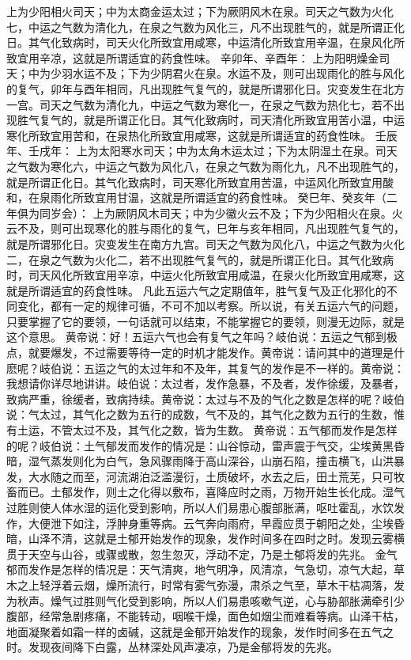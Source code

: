 \documentclass[12pt,UTF8]{ctexbook}
\begin{document}
上为少阳相火司天；中为太商金运太过；下为厥阴风木在泉。司天之气数为火化七，中运之气数为清化九，在泉之气数为风化三，凡不出现胜气的，就是所谓正化日。其气化致病时，司天火化所致宜用咸寒，中运清化所致宜用辛温，在泉风化所致宜用辛凉，这就是所谓适宜的药食性味。
辛卯年、辛酉年：
上为阳明燥金司天；中为少羽水运不及；下为少阴君火在泉。水运不及，则可出现雨化的胜与风化的复气，卯年与酉年相同，凡出现胜气复气的，就是所谓邪化日。灾变发生在北方一宫。司天之气数为清化九，中运之气数为寒化一，在泉之气数为热化七，若不出现胜气复气的，就是所谓正化日。其气化致病时，司天清化所致宜用苦小温，中运寒化所致宜用苦和，在泉热化所致宜用咸寒，这就是所谓适宜的药食性味。
壬辰年、壬戌年：
上为太阳寒水司天；中为太角木运太过；下为太阴湿土在泉。司天之气数为寒化六，中运之气数为风化八，在泉之气数为雨化九，凡不出现胜气的，就是所谓正化日。其气化致病时，司天寒化所致宜用苦温，中运风化所致宜用酸和，在泉雨化所致宜用甘温，这就是所谓适宜的药食性味。
癸巳年、癸亥年（二年俱为同岁会）：
上为厥阴风木司天；中为少徽火云不及；下为少阳相火在泉。火云不及，则可出现寒化的胜与雨化的复气，巳年与亥年相同，凡出现胜气复气的，就是所谓邪化日。灾变发生在南方九宫。司天之气数为风化八，中运之气数为火化二，在泉之气数为火化二，若不出现胜气复气的，就是所谓正化日。其气化致病时，司天风化所致宜用辛凉，中运火化所致宜用咸温，在泉火化所致宜用咸寒，这就是所谓适宜的药食性味。
凡此五运六气之定期值年，胜气复气及正化邪化的不同变化，都有一定的规律可循，不可不加以考察。所以说，有关五运六气的问题，只要掌握了它的要领，一句话就可以结束，不能掌握它的要领，则漫无边际，就是这个意思。
黄帝说：好！五运六气也会有复气之年吗？岐伯说：五运之气郁到极点，就要爆发，不过需要等待一定的时机才能发作。黄帝说：请问其中的道理是什麽呢？岐伯说：五运之气的太过年和不及年，其复气的发作是不一样的。黄帝说：我想请你详尽地讲讲。岐伯说：太过者，发作急暴，不及者，发作徐缓，及暴者，致病严重，徐缓者，致病持续。黄帝说：太过与不及的气化之数是怎样的呢？岐伯说：气太过，其气化之数为五行的成数，气不及的，其气化之数为五行的生数，惟有土运，不管太过不及，其气化之数，皆为生数。
黄帝说：五气郁而发作是怎样的呢？岐伯说：土气郁发而发作的情况是：山谷惊动，雷声震于气交，尘埃黄黑昏暗，湿气蒸发则化为白气，急风骤雨降于高山深谷，山崩石陷，撞击横飞，山洪暴发，大水随之而至，河流湖泊泛滥漫衍，土质破坏，水去之后，田土荒芜，只可牧畜而已。土郁发作，则土之化得以敷布，喜降应时之雨，万物开始生长化成。湿气过胜则使人体水湿的运化受到影响，所以人们易患心腹部胀满，呕吐霍乱，水饮发作，大便泄下如注，浮肿身重等病。云气奔向雨府，早霞应贯于朝阳之处，尘埃昏暗，山泽不清，这就是土郁开始发作的现象，发作时间多在四时之时。发现云雾横贯于天空与山谷，或骤或散，忽生忽灭，浮动不定，乃是土郁将发的先兆。
金气郁而发作是怎样的情况是：天气清爽，地气明净，风清凉，气急切，凉气大起，草木之上轻浮着云烟，燥所流行，时常有雾气弥漫，肃杀之气至，草木干枯凋落，发为秋声。燥气过胜则气化受到影响，所以人们易患咳嗽气逆，心与胁部胀满牵引少腹部，经常急剧疼痛，不能转动，咽喉干燥，面色如烟尘而难看等病。山泽干枯，地面凝聚着如霜一样的卤碱，这就是金郁开始发作的现象，发作时间多在五气之时。发现夜间降下白露，丛林深处风声凄凉，乃是金郁将发的先兆。
\end{document}
